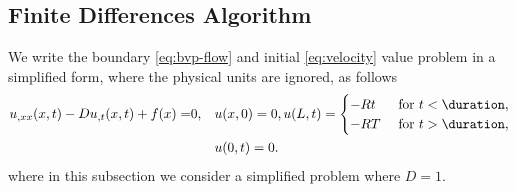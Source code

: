 \documentclass[twoside,a4paper,12pt]{article}
\begin{document}
\subsection{Finite Differences Algorithm}

We write the boundary \eqref{eq:bvp-flow} and initial
\eqref{eq:velocity} value problem in a simplified form, where the
physical units are ignored, as follows
%
\begin{align}
  \label{eq:heat}
  u_{,xx}(x,t) - D u_{,t}(x,t) + f(x) 
  =& 0 ,        &&u(x,0) = 0, u(L,t) =
            \begin{cases}
              -Rt &\text{ for } t < \duration,\\
              -RT &\text{ for } t > \duration,
            \end{cases}\\\nonumber
 &&& u(0,t) = 0.
\end{align}
%
where in this subsection we consider a simplified problem where $D=1$.
\end{document}
